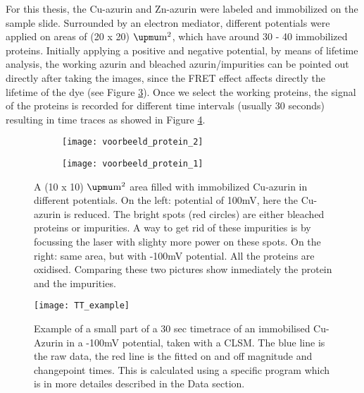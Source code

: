 \documentclass[twoside,single]{lion-msc}
\begin{document}
For this thesis, the Cu-azurin and Zn-azurin were labeled and immobilized on the sample slide. Surrounded by an electron mediator, different potentials were applied on areas of (20 x 20) $\upmu \textup{m}^{2}$, which have around 30 - 40 immobilized proteins. Initially applying a positive and negative potential, by means of lifetime analysis, the working azurin and bleached azurin/impurities can be pointed out directly after taking the images, since the FRET effect affects directly the lifetime of the dye (see Figure \ref{finding_proteins}). Once we select the working proteins, the signal of the proteins is recorded for different time intervals (usually 30 seconds) resulting in time traces as showed in Figure \ref{TT_exam}.

\begin{figure}
\begin{subfigure}{.5\textwidth}
  \centering
  \texttt{[image: voorbeeld\_protein\_2]}
  \label{}
\end{subfigure}%
\begin{subfigure}{.5\textwidth}
  \centering
  \texttt{[image: voorbeeld\_protein\_1]}
  \label{}
\end{subfigure}
\caption{A  (10 x 10) $\upmu \textup{m}^{2}$  area filled with immobilized Cu-azurin in different potentials. On the left: potential of 100mV, here the Cu-azurin is reduced. The bright spots (red circles) are either bleached proteins or impurities. A way to get rid of these impurities is by focussing the laser with slighty more power on these spots. On the right: same area, but with -100mV potential. All the proteins are oxidised. Comparing these two pictures show inmediately the protein and the impurities.}
\label{finding_proteins}
\end{figure}


\begin{figure}[ht!]
\centering
\texttt{[image: TT\_example]}
\caption{Example of a small part of a 30 sec timetrace of an immobilised Cu-Azurin in a -100mV potential, taken with a CLSM. The blue line is the raw data, the red line is the fitted on and off magnitude and changepoint times. This is calculated using a specific program which is in more detailes described in the Data section.} 
\label{TT_exam}
\end{figure}
\end{document}
